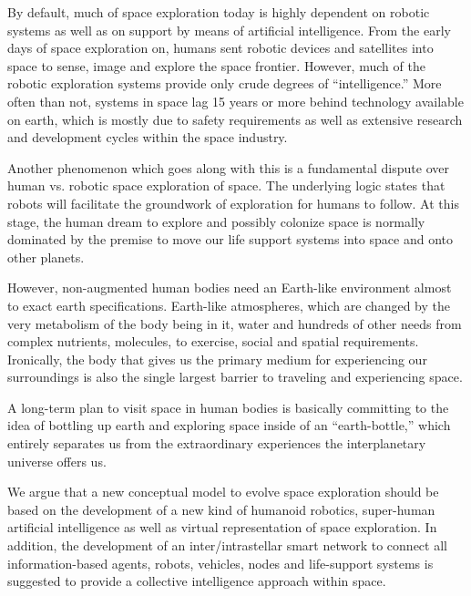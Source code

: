 \documentclass[letter,11pt]{article}
\begin{document}
By default, much of space exploration today is highly dependent on robotic
systems as well as on support by means of artificial intelligence. From the
early days of space exploration on, humans sent robotic devices and satellites
into space to sense, image and explore the space frontier. However, much of the
robotic exploration systems provide only crude degrees of ``intelligence.''
More often than not, systems in space lag 15 years or more behind technology
available on earth, which is mostly due to safety requirements as well as
extensive research and development cycles within the space industry.  

Another phenomenon which goes along with this is a fundamental dispute over
human vs. robotic space exploration of space. The underlying logic states that
robots will facilitate the groundwork of exploration for humans to follow. At
this stage, the human dream to explore and possibly colonize space is normally
dominated by the premise to move our life support systems into space and onto
other planets.

However, non-augmented human bodies need an Earth-like environment almost to
exact earth specifications. Earth-like atmospheres, which are changed by the
very metabolism of the body being in it, water and hundreds of other needs from
complex nutrients, molecules, to exercise, social and spatial requirements.
Ironically, the body that gives us the primary medium for experiencing our
surroundings is also the single largest barrier to traveling and experiencing
space. 

A long-term plan to visit space in human bodies is basically committing to the
idea of bottling up earth and exploring space inside of an ``earth-bottle,''
which entirely separates us from the extraordinary experiences the
interplanetary universe offers us. 

We argue that a new conceptual model to evolve space exploration should be
based on the development of a new kind of humanoid robotics, super-human
artificial intelligence as well as virtual representation of space exploration.
In addition, the development of an inter/intrastellar smart network to connect
all information-based agents, robots, vehicles, nodes and life-support systems
is suggested to provide a collective intelligence approach within space.
\end{document}
